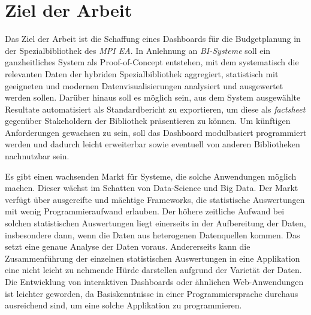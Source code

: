 \section{Ziel der Arbeit}
Das Ziel der Arbeit ist die Schaffung eines Dashboards für die Budgetplanung in der Spezialbibliothek des \textit{\acrshort{MPI EA}}.
In Anlehnung an \textit{\acrshort{BI}-Systeme} soll ein ganzheitliches System als Proof-of-Concept entstehen,
mit dem systematisch die relevanten Daten der hybriden Spezialbibliothek aggregiert, statistisch
mit geeigneten und modernen Datenvisualisierungen analysiert und ausgewertet werden sollen.
Darüber hinaus soll es möglich sein, aus dem System ausgewählte
Resultate automatisiert als Standardbericht zu exportieren, um diese
als \textit{factsheet} gegenüber Stakeholdern der Bibliothek präsentieren zu können.
Um künftigen Anforderungen gewachsen zu sein, soll das Dashboard
modulbasiert programmiert werden und dadurch leicht erweiterbar sowie eventuell von
anderen Bibliotheken nachnutzbar sein.


Es gibt einen wachsenden Markt für Systeme, die solche Anwendungen möglich machen. Dieser wächst im Schatten von Data-Science und Big Data. 
Der Markt verfügt über ausgereifte und mächtige Frameworks, die statistische Auswertungen mit wenig Programmieraufwand erlauben. 
Der höhere zeitliche Aufwand bei solchen statistischen Auswertungen liegt  einerseits in der Aufbereitung der Daten, 
insbesondere dann, wenn die Daten aus heterogenen Datenquellen kommen. 
Das setzt eine genaue Analyse der Daten voraus. Andererseits kann die Zusammenführung der einzelnen statistischen Auswertungen in eine Applikation 
eine nicht leicht zu nehmende Hürde darstellen aufgrund der Varietät der Daten. Die Entwicklung von interaktiven Dashboards oder ähnlichen Web-Anwendungen ist leichter geworden, da
Basiskenntnisse in einer Programmiersprache durchaus ausreichend sind, um eine solche Applikation zu programmieren.


